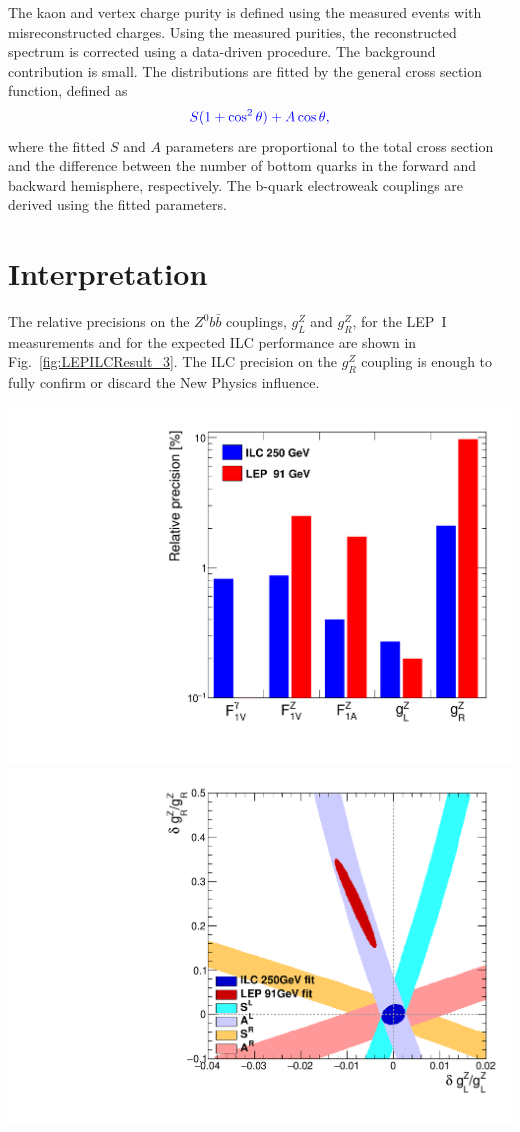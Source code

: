 The kaon and vertex charge purity is defined using the measured events with misreconstructed charges. Using the measured purities, the reconstructed spectrum is corrected using a data-driven procedure.
The background contribution is small. 
The distributions are fitted by the general cross section function, defined as 
\begin{equation}
{\color{Blue}	S (1+\cos^2\theta) + A \cos\theta,}
\end{equation}
where the fitted $S$ and $A$ parameters are proportional to the total cross section and the difference between the number of bottom quarks in the forward and backward hemisphere, respectively. 
The b-quark electroweak couplings are derived using the fitted parameters. 
\section*{Interpretation}

The relative precisions on the $Z^0b\bar{b}$ couplings, $g_L^Z$ and $g_R^Z$, for the LEP~I measurements and for the expected ILC performance are shown in Fig.~\ref{fig:LEPILCResult_3}. The ILC precision on the $g_R^Z$ coupling is enough to fully confirm or discard the New Physics influence. 
\begin{center}\vspace{1cm}

	\includegraphics[width=0.4\linewidth]{../ILD/plots/final-graph.pdf}
	\includegraphics[width=0.4\linewidth]{../ILD/plots/ilc-result.pdf}
		\label{fig:LEPILCResult_3}
\end{center}\vspace{1cm}

